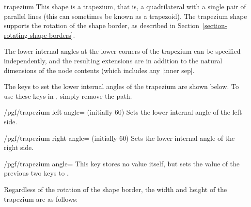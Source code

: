 \begin{shape}{trapezium}
    This shape is a trapezium, that is, a quadrilateral with a single pair of
    parallel lines (this can sometimes be known as a trapezoid). The trapezium
    shape supports the rotation of the shape border, as described in
    Section~\ref{section-rotating-shape-borders}.

    The lower internal angles at the lower corners of the trapezium can be
    specified independently, and the resulting extensions are in addition to
    the natural dimensions of the node contents (which includes any
    |inner sep|.
\begin{codeexample}[preamble={\usetikzlibrary{shapes.geometric}}]
\end{codeexample}

    The \pgfname{} keys to set the lower internal angles of the trapezium are
    shown below. To use these keys in \tikzname, simply remove the
     path.

    \begin{key}{/pgf/trapezium left angle= (initially 60)}
        Sets the lower internal angle of the left side.
    \end{key}

    \begin{key}{/pgf/trapezium right angle= (initially 60)}
        Sets the lower internal angle of the right side.
    \end{key}

    \begin{stylekey}{/pgf/trapezium angle=}
        This key stores no value itself, but sets the value of the previous two
        keys to .
    \end{stylekey}

    Regardless of the rotation of the shape border, the width and height of the
    trapezium are as follows:
\begin{codeexample}[preamble={\usetikzlibrary{shapes.geometric}}]
\end{codeexample}


\end{shape}
